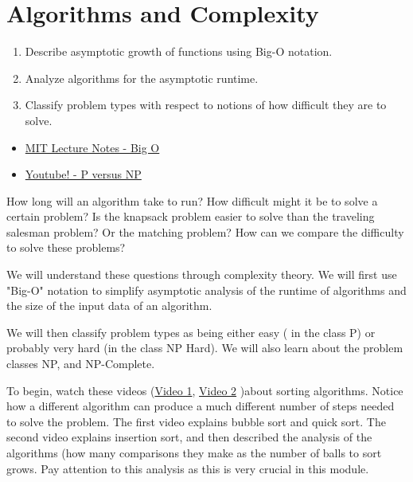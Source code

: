 

%
%

\chapter{Algorithms and Complexity}
\label{sec:complexity}
\begin{outcome}
\begin{enumerate}
\item Describe asymptotic growth of functions using Big-O notation.
\item Analyze algorithms for the asymptotic runtime.
\item Classify problem types with respect to notions of how difficult they are to solve.
\end{enumerate}
\end{outcome}


\begin{resource}
\begin{itemize}
\item \href{http://web.mit.edu/16.070/www/lecture/big_o.pdf}{MIT Lecture Notes - Big O}
\item \href{https://www.youtube.com/watch?v=YX40hbAHx3s}{Youtube! - P versus NP}
\end{itemize}
\end{resource}

How long will an algorithm take to run?   How difficult might it be to solve a certain problem?   Is the knapsack problem easier to solve than the traveling salesman problem?  Or the matching problem?  
How can we compare the difficulty to solve these problems?

 

We will understand these questions through complexity theory.   We will first use "Big-O" notation to simplify asymptotic analysis of the runtime of algorithms and the size of the input data of an algorithm.  

We will then classify problem types as being either easy ( in the class P) or probably very hard (in the class NP Hard).  We will also learn about the problem classes NP, and NP-Complete.  

To begin, watch these videos (\href{https://www.youtube.com/watch?v=aXXWXz5rF64}{Video 1}, \href{https://youtu.be/TZRWRjq2CAg}{Video 2} )about sorting algorithms.  Notice how a different algorithm can produce a much different number of steps needed to solve the problem.  The first video explains bubble sort and quick sort. The second video explains insertion sort, and then described the analysis of the algorithms (how many comparisons they make as the number of balls to sort grows.    Pay attention to this analysis as this is very crucial in this module.




